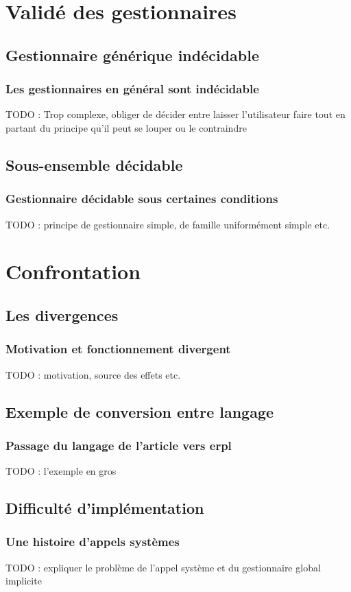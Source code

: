 \documentclass{beamer}
\begin{document}
\section{Validé des gestionnaires}

\subsection{Gestionnaire générique indécidable}
\begin{frame}
	\frametitle{Les gestionnaires en général sont indécidable}
	TODO : Trop complexe, obliger de décider entre laisser l'utilisateur faire tout
	en partant du principe qu'il peut se louper ou le contraindre
\end{frame}

\subsection{Sous-ensemble décidable}
\begin{frame}
	\frametitle{Gestionnaire décidable sous certaines conditions}
	TODO : principe de gestionnaire simple, de famille uniformément simple etc.
\end{frame}

\section{Confrontation}

\subsection{Les divergences}
\begin{frame}
	\frametitle{Motivation et fonctionnement divergent}
	TODO : motivation, source des effets etc.
\end{frame}

\subsection{Exemple de conversion entre langage}
\begin{frame}
	\frametitle{Passage du langage de l'article vers \textbf{erpl}}
	TODO : l'exemple en gros
\end{frame}

\subsection{Difficulté d'implémentation}
\begin{frame}
	\frametitle{Une histoire d'appels systèmes}
	TODO : expliquer le problème de l'appel système et du gestionnaire global implicite
\end{frame}
\end{document}
